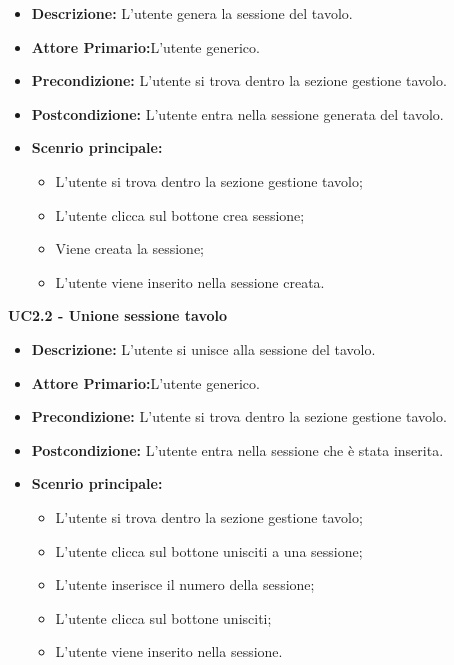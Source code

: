 \begin{itemize}
    \item \textbf{Descrizione:} L'utente genera la sessione del tavolo.
    \item \textbf{Attore Primario:}L'utente generico.
    \item \textbf{Precondizione:} L'utente si trova dentro la sezione gestione tavolo.
    \item \textbf{Postcondizione:} L'utente entra nella sessione generata del tavolo.
    \item \textbf{Scenrio principale:}
    \begin{itemize}
        \item L'utente si trova dentro la sezione gestione tavolo;
        \item L'utente clicca sul bottone crea sessione;
        \item Viene creata la sessione;
        \item L'utente viene inserito nella sessione creata.
    \end{itemize}
\end{itemize}
\textbf{UC2.2 - Unione sessione tavolo}
\begin{itemize}
    \item \textbf{Descrizione:} L'utente si unisce alla sessione del tavolo.
    \item \textbf{Attore Primario:}L'utente generico.
    \item \textbf{Precondizione:} L'utente si trova dentro la sezione gestione tavolo.
    \item \textbf{Postcondizione:} L'utente entra nella sessione che è stata inserita.
    \item \textbf{Scenrio principale:}
    \begin{itemize}
        \item L'utente si trova dentro la sezione gestione tavolo;
        \item L'utente clicca sul bottone unisciti a una sessione;
        \item L'utente inserisce il numero della sessione;
        \item L'utente clicca sul bottone unisciti;
        \item L'utente viene inserito nella sessione.
    \end{itemize}
\end{itemize}
